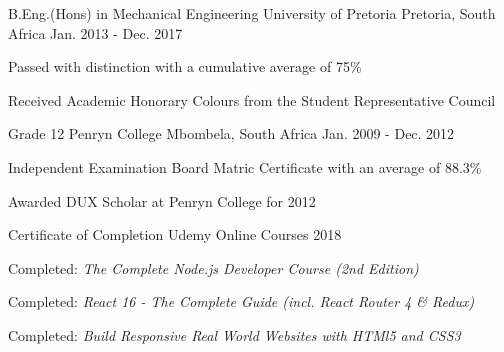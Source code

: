 

\begin{cventries}

  \cventry
    {B.Eng.(Hons) in Mechanical Engineering} %
    {University of Pretoria} %
    {Pretoria, South Africa} %
    {Jan. 2013 - Dec. 2017} %
    {
      \begin{cvitems} %
        \item {Passed with distinction with a cumulative average of 75\%}
        \item {Received Academic Honorary Colours from the Student Representative Council}
      \end{cvitems}
    }
  \cventry
    {Grade 12} %
    {Penryn College} %
    {Mbombela, South Africa} %
    {Jan. 2009 - Dec. 2012} %
    {
      \begin{cvitems} %
        \item {Independent Examination Board Matric Certificate with an average of 88.3\%}
        \item {Awarded DUX Scholar at Penryn College for 2012}
      \end{cvitems}
    }
    \cventry
    {Certificate of Completion} %
    {Udemy} %
    {Online Courses} %
    {2018} %
    {
      \begin{cvitems} %
        \item {Completed: \emph{The Complete Node.js Developer Course (2nd Edition)}}
        \item {Completed: \emph{React 16 - The Complete Guide (incl. React Router 4 \& Redux)}}
        \item {Completed: \emph{Build Responsive Real World Websites with HTMl5 and CSS3}}
      \end{cvitems}
    }


\end{cventries}
